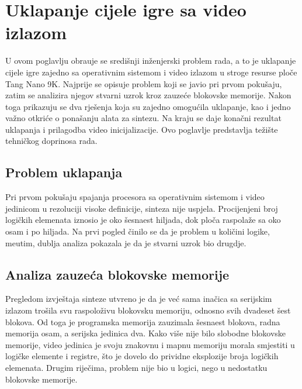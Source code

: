 \chapter{Uklapanje cijele igre sa video izlazom}
\label{ch:uklapanje}

U ovom poglavlju obra\dj{}uje se sredi\v{s}nji in\v{z}enjerski problem rada, a to
je uklapanje cijele igre zajedno sa operativnim sistemom i video izlazom u
stroge resurse plo\v{c}e Tang Nano 9K. Najprije se opisuje problem koji se javio
pri prvom poku\v{s}aju, zatim se analizira njegov stvarni uzrok kroz zauze\'ce
blokovske memorije. Nakon toga prikazuju se dva rje\v{s}enja koja su zajedno
omogu\'cila uklapanje, kao i jedno va\v{z}no otkri\'ce o pona\v{s}anju alata za
sintezu. Na kraju se daje kona\v{c}ni rezultat uklapanja i prilagodba video
inicijalizacije. Ovo poglavlje predstavlja te\v{z}i\v{s}te tehni\v{c}kog
doprinosa rada.

\section{Problem uklapanja}
\label{sec:uklapanje-problem}

Pri prvom poku\v{s}aju spajanja procesora sa operativnim sistemom i video
jedinicom u rezoluciji visoke definicije, sinteza nije uspjela. Procijenjeni
broj logi\v{c}kih elemenata iznosio je oko \v{s}esnaest hiljada, dok plo\v{c}a
raspola\v{z}e sa oko osam i po hiljada. Na prvi pogled \v{c}inilo se da je
problem u koli\v{c}ini logike, me\dj{}utim, dublja analiza pokazala je da je
stvarni uzrok bio drugdje.

\section{Analiza zauze\'ca blokovske memorije}
\label{sec:uklapanje-analiza}

Pregledom izvje\v{s}taja sinteze utvr\dj{}eno je da je ve\'c sama ina\v{c}ica sa
serijskim izlazom tro\v{s}ila svu raspolo\v{z}ivu blokovsku memoriju, odnosno
svih dvadeset \v{s}est blokova. Od toga je programska memorija zauzimala
\v{s}esnaest blokova, radna memorija osam, a serijska jedinica dva. Kako vi\v{s}e
nije bilo slobodne blokovske memorije, video jedinica je svoju znakovnu i mapnu
memoriju morala smjestiti u logi\v{c}ke elemente i registre, \v{s}to je dovelo do
prividne eksplozije broja logi\v{c}kih elemenata. Drugim rije\v{c}ima, problem
nije bio u logici, nego u nedostatku blokovske memorije.

